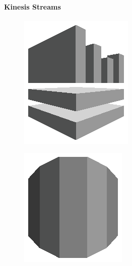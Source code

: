 \documentclass[
12pt,
english,
ngerman,
headsepline,
twoside,
openright,
numbers=noenddot,version=first
]{scrreprt}
\begin{document}
\paragraph{Kinesis Streams}
\begin{figure}
	\includegraphics[width=0.9\linewidth]{./pics/aws/Analytics_GRAYSCALE_AmazonKinesis.eps}
\end{figure}



\begin{figure}
	\includegraphics[width=0.9\linewidth]{./pics/aws/Database_GRAYSCALE_AmazonRDS.eps}
\end{figure}
\end{document}
